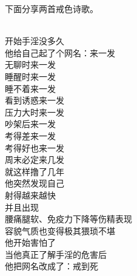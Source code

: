 下面分享两首戒色诗歌。

\begin{poem}[来一发与戒到死]
    \begin{multicols}{2}
        \centering~\\
        开始手淫没多久 \\ 他给自己起了个网名：来一发 \\ 无聊时来一发 \\ 睡醒时来一发 \\ 睡不着来一发 \\ 看到诱惑来一发 \\ 压力大时来一发 \\ 吵架后来一发 \\ 考得差来一发 \\ 考得好也来一发 \\ 周末必定来几发 \\ 就这样撸了几年 \\ 他突然发现自己 \\ 射得越来越快 \\ 并且出现 \\ 腰痛腿软、免疫力下降等伤精表现 \\ 容貌气质也变得极其猥琐不堪 \\ 他开始害怕了 \\ 当他真正了解手淫的危害后 \\ 他把网名改成了：戒到死
    \end{multicols}
\end{poem}

